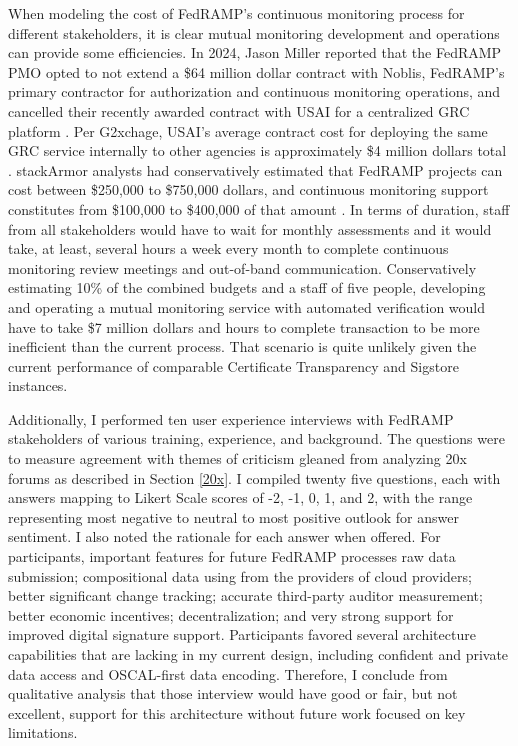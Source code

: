 \documentclass{jdf}
\begin{document}
When modeling the cost of FedRAMP's continuous monitoring process for different stakeholders, it is clear mutual monitoring development and operations can provide some efficiencies. In 2024, Jason Miller reported that the FedRAMP PMO opted to not extend a \$64 million dollar contract with Noblis, FedRAMP's primary contractor for authorization and continuous monitoring operations, and cancelled their recently awarded contract with USAI for a centralized GRC platform \citeyear{miller25}. Per G2xchage, USAI's average contract cost for deploying the same GRC service internally to other agencies is approximately \$4 million dollars total \citeyear{g2xchange_usai25}. stackArmor analysts had conservatively estimated that FedRAMP projects can cost between \$250,000 to \$750,000 dollars, and continuous monitoring support constitutes from \$100,000 to \$400,000 of that amount \citeyear{stackarmor24}. In terms of duration, staff from all stakeholders would have to wait for monthly assessments and it would take, at least, several hours a week every month to complete continuous monitoring review meetings and out-of-band communication. Conservatively estimating 10\% of the combined budgets and a staff of five people, developing and operating a mutual monitoring service with automated verification would have to take \$7 million dollars and hours to complete transaction to be more inefficient than the current process. That scenario is quite unlikely given the current performance of comparable Certificate Transparency and Sigstore instances.

Additionally, I performed ten user experience interviews with FedRAMP stakeholders of various training, experience, and background. The questions were to measure agreement with themes of criticism gleaned from analyzing 20x forums as described in Section \ref{20x}. I compiled twenty five questions, each with answers mapping to Likert Scale scores of -2, -1, 0, 1, and 2, with the range representing most negative to neutral to most positive outlook for answer sentiment. I also noted the rationale for each answer when offered. For participants, important features for future FedRAMP processes raw data submission; compositional data using from the providers of cloud providers; better significant change tracking; accurate third-party auditor measurement; better economic incentives; decentralization; and very strong support for improved digital signature support. Participants favored several architecture capabilities that are lacking in my current design, including confident and private data access and OSCAL-first data encoding. Therefore, I conclude from qualitative analysis that those interview would have good or fair, but not excellent, support for this architecture without future work focused on key limitations.
\end{document}
